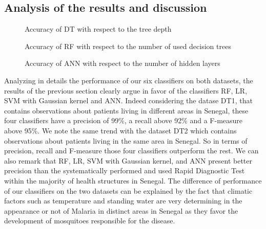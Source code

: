 \subsection{Analysis of the results and discussion}

\begin{figure}[!ht]
\caption{Accuracy of DT  with respect to the tree depth}\label{accy_dt_tree_height}
\end{figure}
%
%
\begin{figure}[!ht]
\caption{Accuracy of RF  with respect to the number of used decision trees}\label{accu_RF_n_trees}
\end{figure}
%
\begin{figure}[!ht]
\caption{Accuracy of ANN with respect to the number of hidden layers}\label{accu_ann_hidden_layers}
\end{figure}

Analyzing in details the performance of our six classifiers on both datasets, the results of the previous section clearly argue in favor of the classifiers RF, LR, SVM with Gaussian kernel and ANN. Indeed considering the datase DT1, that contains observations about patients living in different areas in Senegal, these four classifiers have a precision of 99\%, a recall above 92\% and a F-measure above 95\%. We note the same trend with the dataset DT2 which contains observations about patients living in the same area in Senegal.  So in terms of precision, recall and F-measure those four classifiers outperform the rest. We can also remark that RF, LR, SVM with Gaussian kernel, and ANN present better precision than the systematically performed and used Rapid Diagnostic Test within the majority of health structures in Senegal.
The difference of performance of our classifiers on the two datasets  can be explained by the fact that climatic factors such as temperature and standing water are very determining in the appearance or not of Malaria in distinct areas in Senegal as they favor the development of mosquitoes responsible for the disease.

